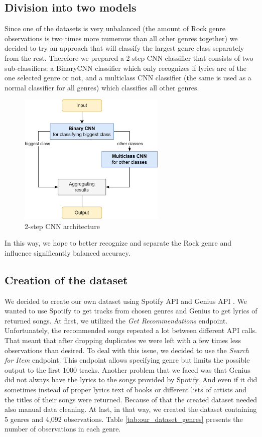 \subsection{Division into two models}

Since one of the datasets is very unbalanced (the amount of Rock genre observations is two times more numerous than all other genres together) we decided to try an approach that will classify the largest genre class separately from the rest. Therefore we prepared a 2-step CNN classifier that consists of two sub-classifiers: a BinaryCNN classifier which only recognizes if lyrics are of the one selected genre or not, and a multiclass CNN classifier (the same is used as a normal classifier for all genres) which classifies all other genres.

\begin{figure}[!h]
\centering
\includegraphics[width=7cm]{plots/2step_cnn_schema.drawio.png}
\caption{2-step CNN architecture}
\end{figure}

In this way, we hope to better recognize and separate the Rock genre and influence significantly balanced accuracy.


\subsection{Creation of the dataset}
We decided to create our own dataset using Spotify API \cite{Spotify} and Genius API \cite{Genius}. We wanted to use Spotify to get tracks from chosen genres and Genius to get lyrics of returned songs. At first, we utilized the \textit{Get Recommendations} endpoint. Unfortunately, the recommended songs repeated a lot between different API calls. That meant that after dropping duplicates we were left with a few times less observations than desired. To deal with this issue, we decided to use the \textit{Search for Item} endpoint. This endpoint allows specifying genre but limits the possible output to the first 1000 tracks. Another problem that we faced was that Genius did not always have the lyrics to the songs provided by Spotify. And even if it did sometimes instead of proper lyrics text of books or different lists of artists and the titles of their songs were returned. Because of that the created dataset needed also manual data cleaning. At last, in that way, we created the dataset containing 5 genres and 4,092 observations. Table \ref{tab:our_dataset_genres} presents the number of observations in each genre.

